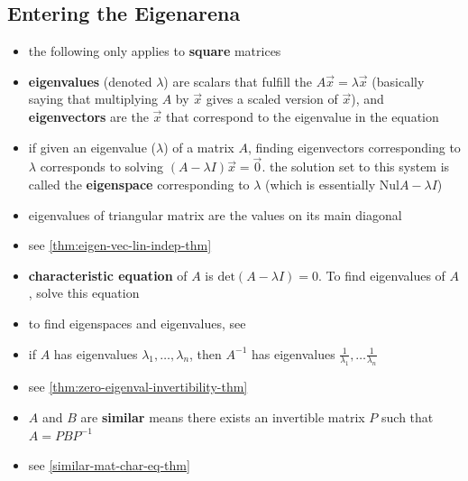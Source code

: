 \documentclass[a4paper,12pt]{article}
\theoremstyle{definition}
\theoremstyle{definition}
\newcommand{\mateq}[3]{#1#2 = #3}
\newcommand{\eigeneq}{\mateq{A}{\vec{x}}{\lambda\vec{x}}}
\newcommand{\finitevecs}[2]{#1_1,\ldots,#1_#2}
\newcommand{\chareq}{\text{det}(A - \lambda I) = 0}
\begin{document}
	\subsection{Entering the Eigenarena}
	\begin{itemize}
		\item the following only applies to \textbf{square} matrices
		
		\item \textbf{eigenvalues} (denoted $\lambda$) are scalars that fulfill the $\eigeneq$ (basically saying that multiplying $A$ by $\vec{x}$ gives a scaled version of $\vec{x}$), and \textbf{eigenvectors} are the $\vec{x}$ that correspond to the eigenvalue in the equation
		
		\item if given an eigenvalue ($\lambda$) of a matrix $A$, finding eigenvectors corresponding to $\lambda$ corresponds to solving $(A - \lambda I)\vec{x} = \vec{0}$. the solution set to this system is called the \textbf{eigenspace} corresponding to $\lambda$ (which is essentially Nul$A - \lambda I$)
		
		\item eigenvalues of triangular matrix are the values on its main diagonal
		
		\item see \autoref{thm:eigen-vec-lin-indep-thm}
		
		\item \textbf{characteristic equation} of $A$ is $\chareq$. To find eigenvalues of $A$, solve this equation
		
		\item to find eigenspaces and eigenvalues, see 
		
		\item if $A$ has eigenvalues $\finitevecs{\lambda}{n}$, then $A^{-1}$ has eigenvalues $\frac{1}{\lambda_1}, \ldots \frac{1}{\lambda_n}$
		
		\item see \autoref{thm:zero-eigenval-invertibility-thm}
		
		\item $A$ and $B$ are \textbf{similar} means there exists an invertible matrix $P$ such that $A = PBP^{-1}$
		
		\item see \autoref{similar-mat-char-eq-thm}
	\end{itemize}
		
\end{document}
